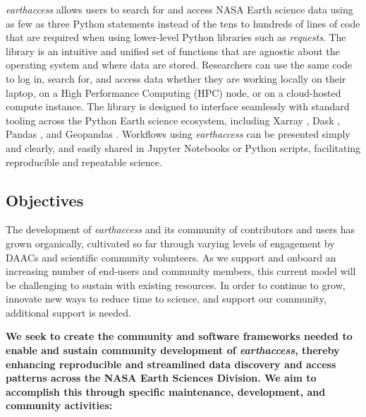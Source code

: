 \documentclass{ROSES-NASA-proposal}
\newcommand{\earthaccess}{\textit{earthaccess}\xspace} %
\begin{document}
\earthaccess allows users to search for and access NASA Earth science data using as few as three Python statements instead of the tens to hundreds of lines of code that are required when using lower-level Python libraries such as \textit{requests}. The library is an intuitive and unified set of functions that are agnostic about the operating system and where data are stored. Researchers can use the same code to log in, search for, and access data whether they are working locally on their laptop, on a High Performance Computing (HPC) node, or on a cloud-hosted compute instance. The library is designed to interface seamlessly with standard tooling across the Python Earth science ecosystem, including Xarray \citep{hoyer2017xarray}, Dask \citep{rocklin2015dask}, Pandas \citep{reback2020pandas, pandas-mckinney}, and Geopandas \citep{geopandas}. Workflows using \earthaccess can be presented simply and clearly, and easily shared in Jupyter Notebooks \citealp{JupyterNotebook} or Python scripts, facilitating reproducible and repeatable science.


\subsection{Objectives}

The development of \earthaccess and its community of contributors and users has grown organically, cultivated so far through varying levels of engagement by DAACs and scientific community volunteers. As we support and onboard an increasing number of end-users and community members, this current model will be challenging to sustain with existing resources. In order to continue to grow, innovate new ways to reduce time to science, and support our community, additional support is needed.

\textbf{We seek to create the community and software frameworks needed to enable and sustain community development of \earthaccess, thereby enhancing reproducible and streamlined data discovery and access patterns across the NASA Earth Sciences Division. We aim to accomplish this through specific maintenance, development, and community activities:} 
\end{document}
